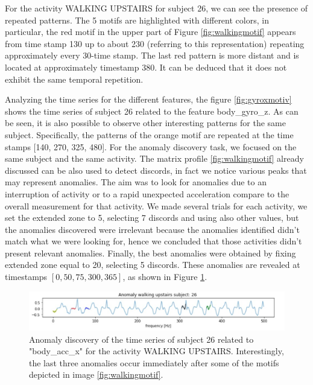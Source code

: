 \documentclass[10pt, a4paper, twocolumn]{article}
\begin{document}


For the activity WALKING  UPSTAIRS for subject 26, we can see the presence of repeated patterns. The 5 motifs are highlighted with different colors, in particular, the red motif in the upper part of Figure \ref{fig:walkingmotif} appears from time stamp 130 up to about 230 (referring to this representation) repeating approximately every 30-time stamp. The last red pattern is more distant and is located at approximately timestamp 380. It can be deduced that it does not exhibit the same temporal repetition.

Analyzing the time series for the different features, the figure \ref{fig:gyroxmotiv} shows the time series of subject 26 related to the feature body\_gyro\_z. As can be seen, it is also possible to observe other interesting patterns for the same subject. Specifically, the patterns of the orange motif are repeated at the time stamps [140, 270, 325, 480]. For the anomaly discovery task, we focused on the same subject and the same activity. The matrix profile \ref{fig:walkingmotif} already discussed can be also used to detect discords, in fact we notice various peaks that may represent anomalies. The aim was to look for anomalies due to an interruption of activity or to a rapid unexpected acceleration compare to the overall measurement for that activity. We made several trials for each activity, we set the extended zone to 5, selecting 7 discords and using also other values, but the anomalies discovered were irrelevant because the anomalies identified  didn't match what we were looking for, hence we concluded that those activities didn't present relevant anomalies. Finally, the best anomalies were obtained by fixing extended zone equal to 20, selecting 5 discords. These anomalies are revealed at timestamps $[0, 50, 75, 300, 365]$, as shown in Figure \ref{fig:anomalymotiv}.

\begin{figure}
    \centering
    \includegraphics[width=\columnwidth]{immagini Lia/anomalyyyyyy.jpg}
    \caption{Anomaly discovery of the time series of subject 26 related to "body\_acc\_x" for the activity WALKING UPSTAIRS. Interestingly, the last three anomalies occur immediately after some of the motifs depicted in image \ref{fig:walkingmotif}.}
    \label{fig:anomalymotiv}
\end{figure}
\end{document}
